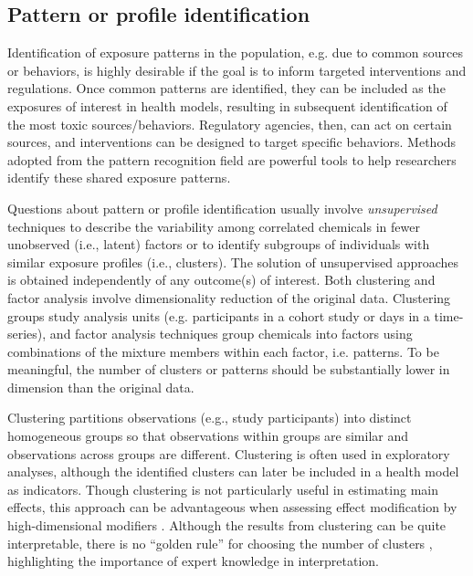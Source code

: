 \subsection{Pattern or profile identification}\label{sec:Patterns}

Identification of exposure patterns in the population, e.g. due to common sources or behaviors, is highly desirable if the goal is to inform targeted interventions and regulations. Once common patterns are identified, they can be included as the exposures of interest in health models, resulting in subsequent identification of the most toxic sources/behaviors. Regulatory agencies, then, can act on certain sources, and interventions can be designed to target specific behaviors. Methods adopted from the pattern recognition field are powerful tools to help researchers identify these shared exposure patterns. 

Questions about pattern or profile identification usually involve \textit{unsupervised} techniques to describe the variability among correlated chemicals in fewer unobserved (i.e., latent) factors or to identify subgroups of individuals with similar exposure profiles (i.e., clusters). The solution of unsupervised approaches is obtained independently of any outcome(s) of interest. Both clustering and factor analysis involve dimensionality reduction of the original data. Clustering groups study analysis units (e.g. participants in a cohort study or days in a time-series), and factor analysis techniques group chemicals into factors using combinations of the mixture members within each factor, i.e. patterns. To be meaningful, the number of clusters or patterns should be substantially lower in dimension than the original data. 

Clustering partitions observations (e.g., study participants) into distinct homogeneous groups so that observations within groups are similar and observations across groups are different. Clustering is often used in exploratory analyses, although the identified clusters can later be included in a health model as indicators. Though clustering is not particularly useful in estimating main effects, this approach can be advantageous when assessing effect modification by high-dimensional modifiers \cite{mak15_clusters}. Although the results from clustering can be quite interpretable, there is no ``golden rule'' for choosing the number of clusters \cite{ISLR}, highlighting the importance of expert knowledge in interpretation.

